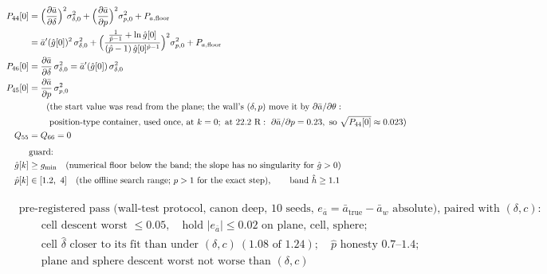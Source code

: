 \documentclass[11pt,a4paper,fontset=none]{ctexart}
\newcommand{\ba}{\bar{a}}
\newcommand{\ap}{\ba'}
\newcommand{\ah}{\hat{\ba}_w}
\newcommand{\hh}{\hat{h}}
\newcommand{\ph}{\hat{p}}
\newcommand{\dl}{\delta}
\newcommand{\dlh}{\hat{\delta}}
\newcommand{\gh}{\hat{g}}
\begin{document}
\begin{align*}
P_{44}[0] &= \Bigl(\frac{\partial\ba}{\partial\dl}\Bigr)^{2}\sigma_{\dl,0}^{2} + \Bigl(\frac{\partial\ba}{\partial p}\Bigr)^{2}\sigma_{p,0}^{2} + P_{a,\mathrm{floor}} \\
          &= \ap(\gh[0])^{2}\,\sigma_{\dl,0}^{2} + \Bigl(\frac{\frac{1}{\ph-1} + \ln\gh[0]}{(\ph - 1)\,\gh[0]^{\ph-1}}\Bigr)^{2}\sigma_{p,0}^{2} + P_{a,\mathrm{floor}} \\
P_{46}[0] &= \frac{\partial\ba}{\partial\dl}\,\sigma_{\dl,0}^{2} = \ap(\gh[0])\,\sigma_{\dl,0}^{2} \\
P_{45}[0] &= \frac{\partial\ba}{\partial p}\,\sigma_{p,0}^{2} \\
          &\qquad(\text{the start value was read from the plane; the wall's } (\dl, p) \text{ move it by } \partial\ba/\partial\theta: \\
          &\qquad\ \text{position-type container, used once, at } k = 0;\ \text{at } 22.2\ \mathrm{R}:\ \partial\ba/\partial p = 0.23,\ \text{so } \sqrt{P_{44}[0]} \approx 0.023) \\
Q_{55} &= Q_{66} = 0 \\[4pt]
&\text{guard:} \\
\gh[k] &\ge g_{\min} \quad(\text{numerical floor below the band; the slope has no singularity for } \gh > 0) \\
\ph[k] &\in [1.2,\ 4] \quad(\text{the offline search range; } p > 1 \text{ for the exact step}), \qquad \text{band } \hh \ge 1.1
\end{align*}

\begin{align*}
&\text{pre-registered pass (wall-test protocol, canon deep, 10 seeds, } e_{\ba} = \ba_{\mathrm{true}} - \ah \text{ absolute), paired with } (\dl, c)\text{:} \\
&\qquad \text{cell descent worst } \le 0.05,\quad \text{hold } |e_{\ba}| \le 0.02 \text{ on plane, cell, sphere;} \\
&\qquad \text{cell } \dlh \text{ closer to its fit than under } (\dl, c)\ (1.08 \text{ of } 1.24);\quad \ph \text{ honesty } 0.7\text{--}1.4; \\
&\qquad \text{plane and sphere descent worst not worse than } (\dl, c)
\end{align*}
\end{document}
